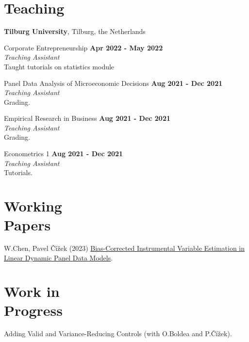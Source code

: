 \documentclass[margin,line]{res}
\begin{document}
\begin{resume}
\section{\sc Teaching}
{\bf Tilburg University}, Tilburg, the Netherlands

\vspace{-.3cm}
Corporate Entrepreneurship \hfill {\bf Apr 2022 - May 2022}\\
 {\em Teaching Assistant}\\
Taught tutorials on statistics module

\vspace{-.3cm}
Panel Data Analysis of Microeconomic Decisions \hfill {\bf Aug 2021 - Dec 2021}\\
{\em Teaching Assistant}\\
Grading.

\vspace{-.3cm}
Empirical Research in Business \hfill {\bf Aug 2021 - Dec 2021}\\
{\em Teaching Assistant}\\
Grading.

\vspace{-.3cm}
Econometrics 1 \hfill {\bf Aug 2021 - Dec 2021}\\
{\em Teaching Assistant}\\
Tutorials.


\section{\sc Working \\ Papers}
W.Chen, Pavel \v{C}\'{i}\v{z}ek (2023) \href{https://pure.uvt.nl/ws/portalfiles/portal/82271980/2023-028.pdf}{Bias-Corrected Instrumental Variable Estimation in Linear Dynamic Panel Data Models}.



\section{\sc Work in \\ Progress}
Adding Valid and Variance-Reducing Controls (with O.Boldea and P.\v{C}\'{i}\v{z}ek).


\end{resume}
\end{document}
